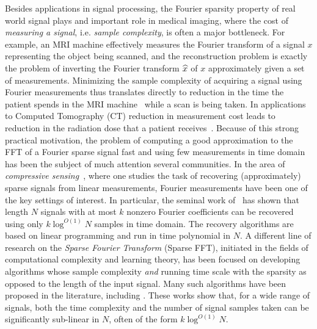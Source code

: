 Besides applications in signal processing, the Fourier sparsity property of real world signal plays and important role in medical imaging, where the cost of {\em measuring a signal}, i.e. {\em sample complexity}, is often a major bottleneck.  For example, an MRI machine effectively measures the Fourier transform of a signal $x$ representing the object being scanned, and the reconstruction problem is exactly the problem of inverting the Fourier transform $\widehat{x}$ of $x$ approximately given a set of measurements. Minimizing the sample complexity of acquiring a signal using Fourier measurements thus translates directly to reduction in the time the patient spends in the MRI machine~\cite{MRICS} while a scan is being taken. In applications to Computed Tomography (CT) reduction in measurement cost leads to reduction in the radiation dose that a patient receives~\cite{CT_CS}.  Because of this strong practical motivation, 
the problem of computing a good approximation to the FFT of a Fourier sparse signal fast and using few measurements in time domain has been the subject of much attention several communities. 
In the area of {\em compressive sensing}~\cite{Don,CTao}, where one studies the task of recovering (approximately) sparse signals from linear measurements,  Fourier measurements have been one of the key settings of interest. In particular, the seminal work of~\cite{CTao,RV} has shown that length $N$ signals with at most $k$ nonzero Fourier coefficients can be recovered using only $k \log^{O(1)} N$ samples in time domain. The recovery algorithms are based on linear programming and run in time polynomial in $N$. %
A different line of research on the {\em Sparse Fourier Transform} (Sparse FFT), initiated in the fields of computational complexity and learning theory, has been focused on  developing algorithms whose sample complexity {\em and} running time scale with the sparsity as opposed to the length of the input signal. Many such algorithms have been proposed in the literature, including \cite{GL,KM,Man,GGIMS,AGS,GMS,Iw,Ak,HIKP,HIKP2,BCGLS,HAKI,pawar2013computing,heidersparse, IKP}. These works show that, for a wide range of signals, both the time complexity and the number of signal samples taken can be significantly sub-linear in $N$, often of the form $k \log^{O(1)} N$.  

